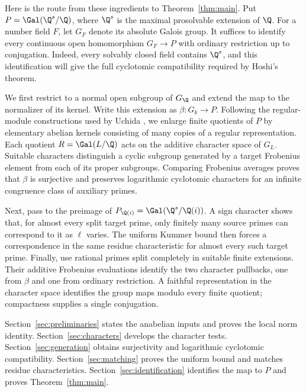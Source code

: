 Here is the route from these ingredients to Theorem~\ref{thm:main}. Put $P=\Gal(\Q^s/\Q)$, where $\Q^s$ is the maximal prosolvable extension of $\Q$. For a number field $F$, let $G_F$ denote its absolute Galois group. It suffices to identify every continuous open homomorphism $G_F\to P$ with ordinary restriction up to conjugation. Indeed, every solvably closed field contains $\Q^s$, and this identification will give the full cyclotomic compatibility required by Hoshi's theorem.

We first restrict to a normal open subgroup of $G_{\Q}$ and extend the map to the normalizer of its kernel. Write this extension as $\beta:G_k\to P$. Following the regular-module constructions used by Uchida \cite{uchida1979}, we enlarge finite quotients of $P$ by elementary abelian kernels consisting of many copies of a regular representation. Each quotient $R=\Gal(L/\Q)$ acts on the additive character space of $G_L$. Suitable characters distinguish a cyclic subgroup generated by a target Frobenius element from each of its proper subgroups. Comparing Frobenius averages proves that $\beta$ is surjective and preserves logarithmic cyclotomic characters for an infinite congruence class of auxiliary primes.

Next, pass to the preimage of $P_{\Q(i)}=\Gal(\Q^s/\Q(i))$. A sign character shows that, for almost every split target prime, only finitely many source primes can correspond to it as $\ell$ varies. The uniform Kummer bound then forces a correspondence in the same residue characteristic for almost every such target prime. Finally, use rational primes split completely in suitable finite extensions. Their additive Frobenius evaluations identify the two character pullbacks, one from $\beta$ and one from ordinary restriction. A faithful representation in the character space identifies the group maps modulo every finite quotient; compactness supplies a single conjugation.

Section~\ref{sec:preliminaries} states the anabelian inputs and proves the local norm identity. Section~\ref{sec:characters} develops the character tests. Section~\ref{sec:generation} obtains surjectivity and logarithmic cyclotomic compatibility. Section~\ref{sec:matching} proves the uniform bound and matches residue characteristics. Section~\ref{sec:identification} identifies the map to $P$ and proves Theorem~\ref{thm:main}.
